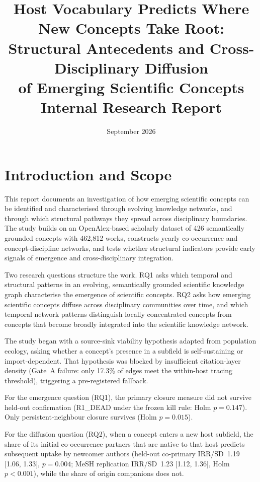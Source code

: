 \documentclass[11pt,letterpaper]{article}
\title{Host Vocabulary Predicts Where New Concepts Take Root:\\
Structural Antecedents and Cross-Disciplinary Diffusion\\
of Emerging Scientific Concepts\\[6pt]
\large Internal Research Report}
\author{}
\date{September 2026}
\begin{document}
\maketitle
\tableofcontents
\clearpage

\section{Introduction and Scope}

This report documents an investigation of how emerging scientific concepts can be identified and characterised through evolving knowledge networks, and through which structural pathways they spread across disciplinary boundaries.
The study builds on an OpenAlex-based scholarly dataset of 426 semantically grounded concepts with 462,812 works, constructs yearly co-occurrence and concept-discipline networks, and tests whether structural indicators provide early signals of emergence and cross-disciplinary integration.

Two research questions structure the work.
RQ1 asks which temporal and structural patterns in an evolving, semantically grounded scientific knowledge graph characterise the emergence of scientific concepts.
RQ2 asks how emerging scientific concepts diffuse across disciplinary communities over time, and which temporal network patterns distinguish locally concentrated concepts from concepts that become broadly integrated into the scientific knowledge network.

The study began with a source-sink viability hypothesis adapted from population ecology, asking whether a concept's presence in a subfield is self-sustaining or import-dependent.
That hypothesis was blocked by insufficient citation-layer density (Gate~A failure: only 17.3\% of edges meet the within-host tracing threshold), triggering a pre-registered fallback.

For the emergence question (RQ1), the primary closure measure did not survive held-out confirmation (R1\_DEAD under the frozen kill rule: Holm $p = 0.147$).
Only persistent-neighbour closure survives (Holm $p = 0.015$).

For the diffusion question (RQ2), when a concept enters a new host subfield, the share of its initial co-occurrence partners that are native to that host predicts subsequent uptake by newcomer authors (held-out co-primary IRR/SD~1.19 [1.06, 1.33], $p = 0.004$; MeSH replication IRR/SD~1.23 [1.12, 1.36], Holm $p < 0.001$), while the share of origin companions does not.
\end{document}
